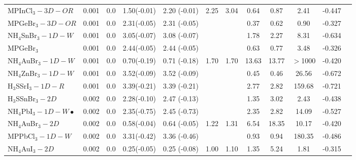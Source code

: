 \begin{table*}
\begin{tabular*}{0.98\textwidth}{@{\extracolsep{\fill}}l c c c c c c c c c c c}
    MPInCl$_3-3D-OR$&      0.001&        0.0&       1.50(-0.01)&            2.20  (-0.01)&       2.25&            3.04&            0.64&            0.87&            2.41&     -0.447\\
    MPGeBr$_3-3D-OR$&      0.001&        0.0&       2.31(-0.05)&            2.31  (-0.05)&           &                &            0.37&            0.62&            0.90&     -0.327\\
 NH$_4$SnBr$_3-1D-W$&      0.001&        0.0&       3.05(-0.07)&            3.08  (-0.07)&           &                &            1.78&            2.27&            8.31&     -0.634\\
          MPGeBr$_3$&      0.001&        0.0&       2.44(-0.05)&            2.44  (-0.05)&           &                &            0.63&            0.77&            3.48&     -0.326\\
 NH$_4$AuBr$_3-1D-W$&      0.001&        0.0&       0.70(-0.19)&            0.71  (-0.18)&       1.70&            1.70&           13.63&           13.77&         $>$1000&     -0.420\\
 NH$_4$ZnBr$_3-1D-W$&      0.001&        0.0&       3.52(-0.09)&            3.52  (-0.09)&           &                &            0.45&            0.46&           26.56&     -0.672\\
  H$_3$SSrI$_3-1D-R$&      0.001&        0.0&       3.39(-0.21)&            3.39  (-0.21)&           &                &            2.77&            2.82&          159.68&     -0.721\\
   H$_3$SSnBr$_3-2D$&      0.002&        0.0&       2.28(-0.10)&            2.47  (-0.13)&           &                &            1.35&            3.02&            2.43&     -0.438\\
NH$_4$PbI$_3-1D-W\bullet$&      0.002&        0.0&       2.35(-0.75)&            2.45  (-0.73)&           &                &            2.35&            2.82&           14.09&     -0.527\\
   NH$_4$AuBr$_3-2D$&      0.002&        0.0&       0.58(-0.04)&            0.64  (-0.05)&       1.22&            1.31&            6.54&           18.35&           10.17&     -0.420\\
     MPPbCl$_3-1D-W$&      0.002&        0.0&       3.31(-0.42)&            3.36  (-0.46)&           &                &            0.93&            0.94&          180.35&     -0.486\\
    NH$_4$AuI$_3-2D$&      0.002&        0.0&       0.25(-0.05)&            0.25  (-0.08)&       1.00&            1.10&            1.35&            5.24&            1.81&     -0.315\\

\end{tabular*}
\end{table*}
